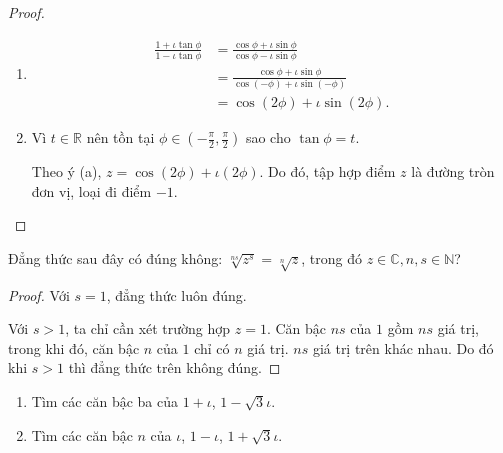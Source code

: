 \begin{proof}
    \begin{enumerate}[label = (\alph*)]
        \item
              \begin{align*}
                  \frac{1 + \iota\tan\phi}{1 - \iota\tan\phi} & = \frac{\cos\phi + \iota\sin\phi}{\cos\phi - \iota\sin\phi}       \\
                                                              & = \frac{\cos\phi + \iota\sin\phi}{\cos(-\phi) + \iota\sin(-\phi)} \\
                                                              & = \cos(2\phi) + \iota\sin(2\phi).
              \end{align*}
        \item Vì $t\in\mathbb{R}$ nên tồn tại $\phi\in\left(-\frac{\pi}{2},\frac{\pi}{2}\right)$ sao cho $\tan\phi = t$.
              
              Theo ý (a), $z = \cos (2\phi) + \iota(2\phi)$. Do đó, tập hợp điểm $z$ là đường tròn đơn vị, loại đi điểm $-1$.
    \end{enumerate}
\end{proof}

\begin{exercise}Đẳng thức sau đây có đúng không: $\sqrt[ns]{z^{s}} = \sqrt[n]{z}$, trong đó $z\in\mathbb{C}, n, s\in\mathbb{N}$?
\end{exercise}

\begin{proof}
    Với $s = 1$, đẳng thức luôn đúng.
    
    Với $s > 1$, ta chỉ cần xét trường hợp $z = 1$. Căn bậc $ns$ của $1$ gồm $ns$ giá trị, trong khi đó, căn bậc $n$ của $1$ chỉ có $n$ giá trị. $ns$ giá trị trên khác nhau. Do đó khi $s > 1$ thì đẳng thức trên không đúng.
\end{proof}

\begin{exercise}
    \begin{enumerate}[label = (\alph*)]
        \item Tìm các căn bậc ba của $1 + \iota$, $1 - \sqrt{3}\iota$.
        \item Tìm các căn bậc $n$ của $\iota$, $1 - \iota$, $1 + \sqrt{3}\iota$.
    \end{enumerate}
\end{exercise}

